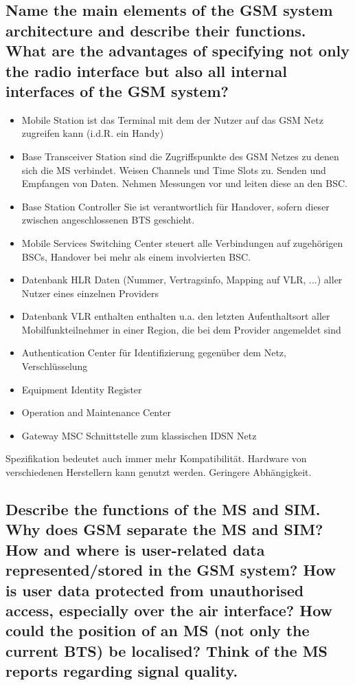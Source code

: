 \subsection{Name the main elements of the GSM system architecture and describe their functions. What are the advantages of specifying not only the radio interface but also all internal interfaces of the GSM system?}
\begin{itemize}
\item Mobile Station ist das Terminal mit dem der Nutzer auf das GSM Netz zugreifen kann (i.d.R. ein Handy)

\item Base Transceiver Station sind die Zugriffspunkte des GSM Netzes zu denen sich die MS verbindet. Weisen Channels und Time Slots zu. Senden und Empfangen von Daten. Nehmen Messungen vor und leiten diese an den BSC.

\item Base Station Controller  Sie ist verantwortlich für Handover, sofern dieser zwischen angeschlossenen BTS geschieht.

\item Mobile Services Switching Center steuert alle Verbindungen auf zugehörigen BSCs, Handover bei mehr als einem involvierten BSC.

\item Datenbank HLR Daten (Nummer, Vertragsinfo, Mapping auf VLR, ...) aller Nutzer eines einzelnen Providers

 \item Datenbank VLR enthalten enthalten u.a. den letzten Aufenthaltsort aller Mobilfunkteilnehmer in einer Region, die bei dem Provider angemeldet sind

\item Authentication Center für Identifizierung gegenüber dem Netz, Verschlüsselung

\item Equipment Identity Register 

\item Operation and Maintenance Center

\item Gateway MSC Schnittstelle zum klassischen IDSN Netz
\end{itemize}

Spezifikation bedeutet auch immer mehr Kompatibilität. Hardware von verschiedenen Herstellern kann genutzt werden. Geringere Abhängigkeit.


\subsection{Describe the functions of the MS and SIM. Why does GSM separate the MS and SIM? How and where is user-related data represented/stored in the GSM system? How is user data protected from unauthorised access, especially over the air interface? How could the position of an MS (not only the current BTS) be localised? Think of the MS reports regarding signal quality.}

